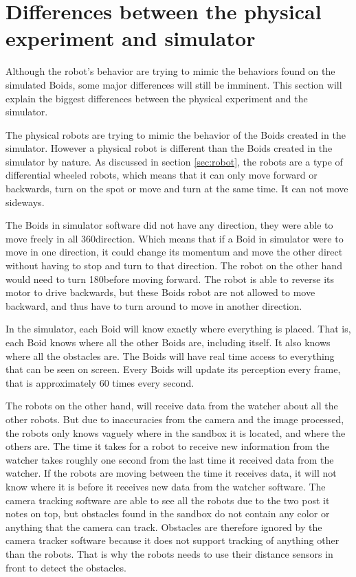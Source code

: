 
\section{Differences between the physical experiment and simulator}
Although the robot's behavior are trying to mimic the behaviors found on the simulated Boids, some major differences will still be imminent. This section will explain the biggest differences between the physical experiment and the simulator. 

The physical robots are trying to mimic the behavior of the Boids created in the simulator. However a physical robot is different than the Boids created in the simulator by nature. As discussed in section \ref{sec:robot}, the robots are a type of differential wheeled robots, which means that it can only move forward or backwards, turn on the spot or move and turn at the same time. It can not move sideways.

The Boids in simulator software did not have any direction, they were able to move freely in all 360\textdegree direction. Which means that if a Boid in simulator were to move in one direction, it could change its momentum and move the other direct without having to stop and turn to that direction. The robot on the other hand would need to turn 180\textdegree before moving forward. The robot is able to reverse its motor to drive backwards, but these Boids robot are not allowed to move backward, and thus have to turn around to move in another direction.

In the simulator, each Boid will know exactly where everything is placed. That is, each Boid knows where all the other Boids are, including itself. It also knows where all the obstacles are. The Boids will have real time access to everything that can be seen on screen. Every Boids will update its perception every frame, that is approximately 60 times every second.

The robots on the other hand, will receive data from the watcher about all the other robots. But due to inaccuracies from the camera and the image processed, the robots only knows vaguely where in the sandbox it is located, and where the others are. The time it takes for a robot to receive new information from the watcher takes roughly one second from the last time it received data from the watcher. If the robots are moving between the time it receives data, it will not know where it is before it receives new data from the watcher software. The camera tracking software are able to see all the robots due to the two post it notes on top, but obstacles found in the sandbox do not contain any color or anything that the camera can track. Obstacles are therefore ignored by the camera tracker software because it does not support tracking of anything other than the robots. That is why the robots needs to use their distance sensors in front to detect the obstacles.

